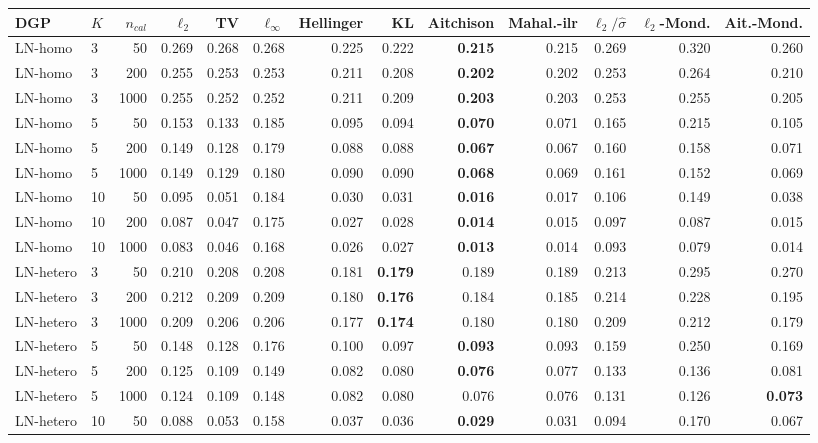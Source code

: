 \begin{tabular}{llrrrrrrrrrrr}
\toprule
DGP & $K$ & $n_{cal}$ & $\ell_2$ & TV & $\ell_\infty$ & Hellinger & KL & Aitchison & Mahal.-ilr & $\ell_2/\hat\sigma$ & $\ell_2$-Mond. & Ait.-Mond. \\
\midrule
LN-homo & 3 & 50 & 0.269 & 0.268 & 0.268 & 0.225 & 0.222 & \textbf{0.215} & 0.215 & 0.269 & 0.320 & 0.260 \\
LN-homo & 3 & 200 & 0.255 & 0.253 & 0.253 & 0.211 & 0.208 & \textbf{0.202} & 0.202 & 0.253 & 0.264 & 0.210 \\
LN-homo & 3 & 1000 & 0.255 & 0.252 & 0.252 & 0.211 & 0.209 & \textbf{0.203} & 0.203 & 0.253 & 0.255 & 0.205 \\
LN-homo & 5 & 50 & 0.153 & 0.133 & 0.185 & 0.095 & 0.094 & \textbf{0.070} & 0.071 & 0.165 & 0.215 & 0.105 \\
LN-homo & 5 & 200 & 0.149 & 0.128 & 0.179 & 0.088 & 0.088 & \textbf{0.067} & 0.067 & 0.160 & 0.158 & 0.071 \\
LN-homo & 5 & 1000 & 0.149 & 0.129 & 0.180 & 0.090 & 0.090 & \textbf{0.068} & 0.069 & 0.161 & 0.152 & 0.069 \\
LN-homo & 10 & 50 & 0.095 & 0.051 & 0.184 & 0.030 & 0.031 & \textbf{0.016} & 0.017 & 0.106 & 0.149 & 0.038 \\
LN-homo & 10 & 200 & 0.087 & 0.047 & 0.175 & 0.027 & 0.028 & \textbf{0.014} & 0.015 & 0.097 & 0.087 & 0.015 \\
LN-homo & 10 & 1000 & 0.083 & 0.046 & 0.168 & 0.026 & 0.027 & \textbf{0.013} & 0.014 & 0.093 & 0.079 & 0.014 \\
\midrule
LN-hetero & 3 & 50 & 0.210 & 0.208 & 0.208 & 0.181 & \textbf{0.179} & 0.189 & 0.189 & 0.213 & 0.295 & 0.270 \\
LN-hetero & 3 & 200 & 0.212 & 0.209 & 0.209 & 0.180 & \textbf{0.176} & 0.184 & 0.185 & 0.214 & 0.228 & 0.195 \\
LN-hetero & 3 & 1000 & 0.209 & 0.206 & 0.206 & 0.177 & \textbf{0.174} & 0.180 & 0.180 & 0.209 & 0.212 & 0.179 \\
LN-hetero & 5 & 50 & 0.148 & 0.128 & 0.176 & 0.100 & 0.097 & \textbf{0.093} & 0.093 & 0.159 & 0.250 & 0.169 \\
LN-hetero & 5 & 200 & 0.125 & 0.109 & 0.149 & 0.082 & 0.080 & \textbf{0.076} & 0.077 & 0.133 & 0.136 & 0.081 \\
LN-hetero & 5 & 1000 & 0.124 & 0.109 & 0.148 & 0.082 & 0.080 & 0.076 & 0.076 & 0.131 & 0.126 & \textbf{0.073} \\
LN-hetero & 10 & 50 & 0.088 & 0.053 & 0.158 & 0.037 & 0.036 & \textbf{0.029} & 0.031 & 0.094 & 0.170 & 0.067 \\

\end{tabular}
